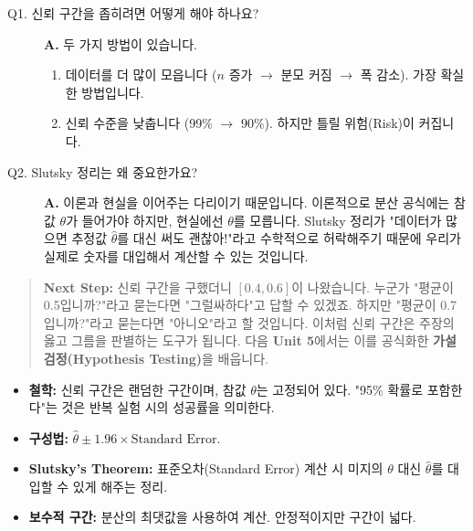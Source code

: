 \documentclass[11pt,a4paper]{book}
\theoremstyle{definition}
\begin{document}
\begin{description}
    \item[Q1. 신뢰 구간을 좁히려면 어떻게 해야 하나요?]
    \textbf{A.} 두 가지 방법이 있습니다.
    \begin{enumerate}
        \item 데이터를 더 많이 모읍니다 ($n$ 증가 $\to$ 분모 커짐 $\to$ 폭 감소). 가장 확실한 방법입니다.
        \item 신뢰 수준을 낮춥니다 (99\% $\to$ 90\%). 하지만 틀릴 위험(Risk)이 커집니다.
    \end{enumerate}
    
    \item[Q2. Slutsky 정리는 왜 중요한가요?]
    \textbf{A.} 이론과 현실을 이어주는 다리이기 때문입니다. 이론적으로 분산 공식에는 참값 $\theta$가 들어가야 하지만, 현실에선 $\theta$를 모릅니다. Slutsky 정리가 "데이터가 많으면 추정값 $\hat{\theta}$를 대신 써도 괜찮아!"라고 수학적으로 허락해주기 때문에 우리가 실제로 숫자를 대입해서 계산할 수 있는 것입니다.
\end{description}

\vspace{1cm}
\begin{quote}
\textbf{Next Step:} 신뢰 구간을 구했더니 $[0.4, 0.6]$이 나왔습니다. 누군가 "평균이 0.5입니까?"라고 묻는다면 "그럴싸하다"고 답할 수 있겠죠. 하지만 "평균이 0.7입니까?"라고 묻는다면 "아니오"라고 할 것입니다. 이처럼 신뢰 구간은 주장의 옳고 그름을 판별하는 도구가 됩니다. 다음 \textbf{Unit 5}에서는 이를 공식화한 \textbf{가설 검정(Hypothesis Testing)}을 배웁니다.
\end{quote}

\begin{summarybox}[title={Unit 4 핵심 요약}]
\begin{itemize}
    \item \textbf{철학:} 신뢰 구간은 랜덤한 구간이며, 참값 $\theta$는 고정되어 있다. "95\% 확률로 포함한다"는 것은 반복 실험 시의 성공률을 의미한다.
    \item \textbf{구성법:} $\hat{\theta} \pm 1.96 \times \text{Standard Error}$.
    \item \textbf{Slutsky's Theorem:} 표준오차(Standard Error) 계산 시 미지의 $\theta$ 대신 $\hat{\theta}$를 대입할 수 있게 해주는 정리.
    \item \textbf{보수적 구간:} 분산의 최댓값을 사용하여 계산. 안정적이지만 구간이 넓다.
\end{itemize}
\end{summarybox}
\end{document}
